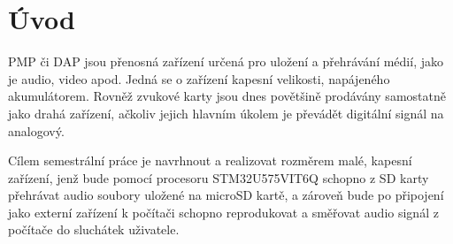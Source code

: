 \chapter*{Úvod}
{}

\ac{PMP} či \ac{DAP} jsou přenosná zařízení určená pro uložení a přehrávání médií, jako je audio, video apod. Jedná se o zařízení kapesní velikosti, napájeného akumulátorem. 
Rovněž zvukové karty jsou dnes povětšině prodávány samostatně jako drahá zařízení, ačkoliv jejich hlavním úkolem je převádět digitální signál na analogový.

Cílem semestrální práce je navrhnout a realizovat rozměrem malé, kapesní zařízení, jenž bude pomocí procesoru STM32U575VIT6Q schopno z SD karty přehrávat audio soubory uložené na microSD kartě, a zároveň bude po připojení jako externí zařízení k počítači schopno reprodukovat a směřovat audio signál z počítače do sluchátek uživatele.






